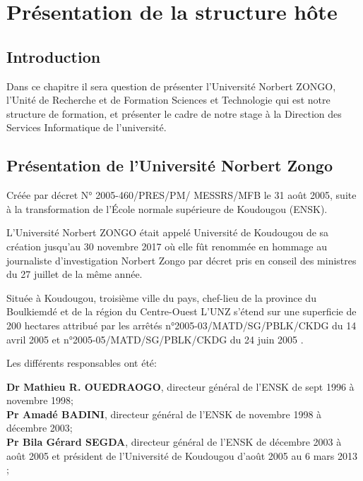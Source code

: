 \chapter{Présentation de la structure hôte}
\begin{spacing}{1.2}
\minitoc
\thispagestyle{MyStyle}
\end{spacing}
\newpage

\section*{Introduction}
Dans ce chapitre il sera question de présenter l’Université Norbert ZONGO, l’Unité de Recherche et de Formation Sciences et Technologie qui est notre structure de formation, et présenter le cadre de notre stage à la Direction des Services Informatique de l’université.
\section{Présentation de l’Université Norbert Zongo}
Créée par décret N° 2005-460/PRES/PM/ MESSRS/MFB le 31 août 2005, suite à la transformation de l’École normale supérieure de Koudougou (ENSK)\cite{infoUNZbf}.

\par L’Université Norbert ZONGO était appelé Université de Koudougou de sa création jusqu’au 30 novembre 2017 où elle fût renommée en hommage au journaliste d'investigation Norbert Zongo par décret pris en conseil des ministres du 27 juillet de la même année. \cite{infoUNZbf}
 
\par Située à Koudougou, troisième ville du pays, chef-lieu de la province du Boulkiemdé et de la région du Centre-Ouest L’UNZ s’étend sur une superficie de 200 hectares attribué par les arrêtés n°2005-03/MATD/SG/PBLK/CKDG du 14 avril 2005 et n°2005-05/MATD/SG/PBLK/CKDG du 24 juin 2005 \cite{infoUNZbf}.
\par

Les différents responsables ont été:

\textbf{Dr Mathieu R. OUEDRAOGO}, directeur général de l’ENSK de sept 1996 à novembre 1998;\\

\textbf{Pr Amadé BADINI}, directeur général de l’ENSK de novembre 1998 à décembre 2003;\\

\textbf{Pr Bila Gérard SEGDA}, directeur général de l’ENSK de décembre 2003 à août 2005 et président de l’Université de Koudougou d’août 2005 au 6 mars 2013 ;\\


